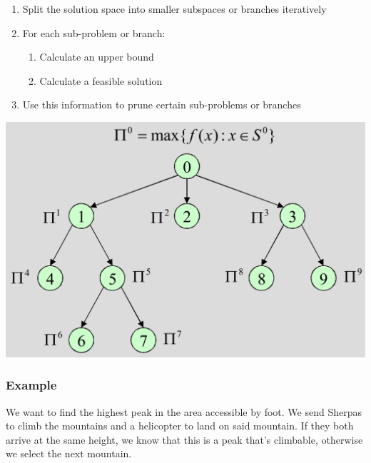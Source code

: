 \documentclass[11pt]{article}
\begin{document}
\noindent
\begin{minipage}{0.6\linewidth}
	\begin{enumerate}[label=\arabic*.]
		\item Split the solution space into smaller subspaces or branches iteratively
		\item For each sub-problem or branch:
		\begin{enumerate}[label*=\roman*]
			\item Calculate an upper bound
			\item Calculate a feasible solution
		\end{enumerate}
		\item Use this information to prune certain sub-problems or branches
	\end{enumerate}
\end{minipage}
\begin{minipage}{0.4\linewidth}
	\centering
	\includegraphics[width=0.9\linewidth,keepaspectratio]{branch_and_bound.png}
\end{minipage}

\subsubsection{Example}
We want to find the highest peak in the area accessible by foot. We send Sherpas to climb the mountains and a helicopter to land on said mountain. If they both arrive at the same height, we know that this is a peak that's climbable, otherwise we select the next mountain.
\end{document}

